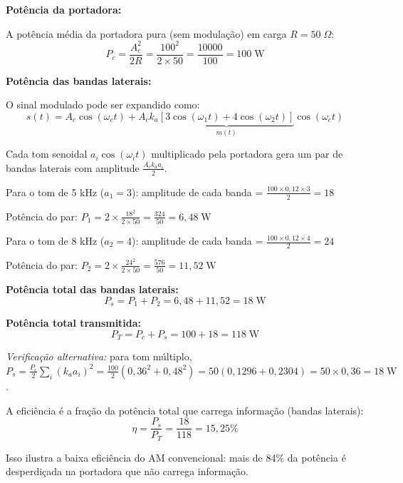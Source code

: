 \documentclass[11pt,a4paper]{article}
\begin{document}
\begin{resolucao}

\textbf{Potência da portadora:}

A potência média da portadora pura (sem modulação) em carga $R = 50\;\Omega$:
\[
  P_c = \frac{A_c^2}{2R} = \frac{100^2}{2 \times 50} = \frac{10000}{100} = \boxed{100\;\text{W}}
\]

\textbf{Potência das bandas laterais:}

O sinal modulado pode ser expandido como:
\[
  s(t) = A_c\cos(\omega_c t) + A_c k_a \underbrace{\left[3\cos(\omega_1 t) + 4\cos(\omega_2 t)\right]}_{m(t)} \cos(\omega_c t)
\]

Cada tom senoidal $a_i\cos(\omega_i t)$ multiplicado pela portadora gera um par de bandas laterais com amplitude $\frac{A_c k_a a_i}{2}$.

Para o tom de 5 kHz ($a_1 = 3$): amplitude de cada banda = $\frac{100 \times 0{,}12 \times 3}{2} = 18$

Potência do par: $P_1 = 2 \times \frac{18^2}{2 \times 50} = \frac{324}{50} = 6{,}48\;\text{W}$

Para o tom de 8 kHz ($a_2 = 4$): amplitude de cada banda = $\frac{100 \times 0{,}12 \times 4}{2} = 24$

Potência do par: $P_2 = 2 \times \frac{24^2}{2 \times 50} = \frac{576}{50} = 11{,}52\;\text{W}$

\textbf{Potência total das bandas laterais:}
\[
  P_s = P_1 + P_2 = 6{,}48 + 11{,}52 = \boxed{18\;\text{W}}
\]

\textbf{Potência total transmitida:}
\[
  \boxed{P_T = P_c + P_s = 100 + 18 = 118\;\text{W}}
\]

\textit{Verificação alternativa:} para tom múltiplo, $P_s = \frac{P_c}{2}\sum_i (k_a a_i)^2 = \frac{100}{2}(0{,}36^2 + 0{,}48^2) = 50(0{,}1296 + 0{,}2304) = 50 \times 0{,}36 = 18\;\text{W}$. \checkmark
\end{resolucao}

\begin{resolucao}

A eficiência é a fração da potência total que carrega informação (bandas laterais):
\[
  \eta = \frac{P_s}{P_T} = \frac{18}{118} = \boxed{15{,}25\%}
\]

Isso ilustra a baixa eficiência do AM convencional: mais de 84\% da potência é desperdiçada na portadora que não carrega informação.
\end{resolucao}
\end{document}
